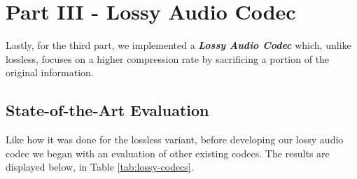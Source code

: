 \chapter{Part III - Lossy Audio Codec}

Lastly, for the third part, we implemented a \textbf{\textit{Lossy Audio Codec}} which, unlike lossless, focuses on a higher compression rate by sacrificing a portion of the original information.


\vspace{10pt}
\section{State-of-the-Art Evaluation}

Like how it was done for the lossless variant, before developing our lossy audio codec we began with an evaluation of other existing codecs. The results are displayed below, in Table \ref{tab:lossy-codecs}.


